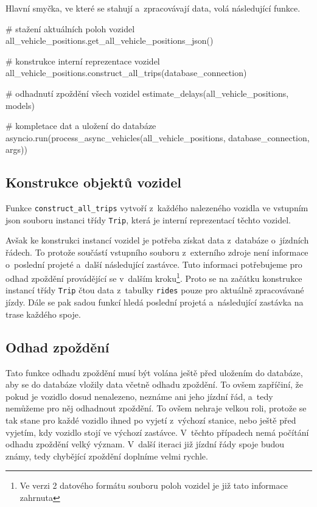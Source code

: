 \bigbreak


Hlavní smyčka, ve které se stahují a~zpracovávají data, volá následující funkce.


\begin{code}[frame=none]
# stažení aktuálních poloh vozidel
all_vehicle_positions.get_all_vehicle_positions_json()

# konstrukce interní reprezentace vozidel
all_vehicle_positions.construct_all_trips(database_connection)

# odhadnutí zpoždění všech vozidel
estimate_delays(all_vehicle_positions, models)

# kompletace dat a uložení do databáze
asyncio.run(process_async_vehicles(all_vehicle_positions,
database_connection, args))
\end{code}


\subsection{Konstrukce objektů vozidel}


Funkce \verb-construct_all_trips- vytvoří z~každého nalezeného vozidla ve vstupním \gls{json} souboru instanci třídy \verb-Trip-, která je interní reprezentací těchto vozidel.


\bigbreak


Avšak ke konstrukci instancí vozidel je potřeba získat data z~databáze o~jízdních řádech. To protože součástí vstupního souboru z~externího zdroje není informace o~poslední projeté a~další následující zastávce. Tuto informaci potřebujeme pro odhad zpoždění provádějící se v~dalším kroku\footnote{Ve verzi 2 datového formátu souboru poloh vozidel je již tato informace zahrnuta}. Proto se na začátku konstrukce instancí třídy \verb-Trip- čtou data z~tabulky \verb-rides- pouze pro aktuálně zpracovávané jízdy. Dále se pak sadou funkcí hledá poslední projetá a~následující zastávka na trase každého spoje.


\subsection{Odhad zpoždění}


Tato funkce odhadu zpoždění musí být volána ještě před uložením do databáze, aby se do databáze vložily data včetně odhadu zpoždění. To ovšem zapříčiní, že pokud je vozidlo dosud nenalezeno, neznáme ani jeho jízdní řád, a~tedy nemůžeme pro něj odhadnout zpoždění. To ovšem nehraje velkou roli, protože se tak stane pro každé vozidlo ihned po vyjetí z~výchozí stanice, nebo ještě před vyjetím, kdy vozidlo stojí ve výchozí zastávce. V~těchto případech nemá počítání odhadu zpoždění velký význam. V~další iteraci již jízdní řády spoje budou známy, tedy chybějící zpoždění doplníme velmi rychle.


